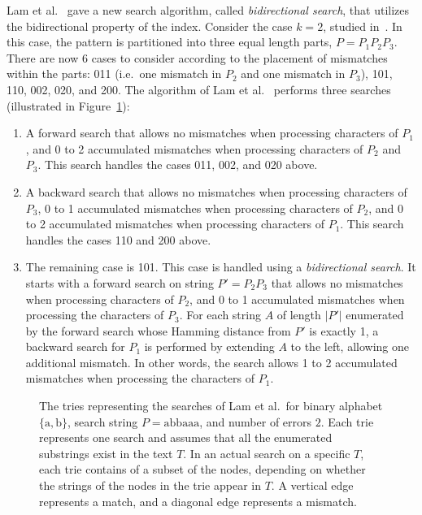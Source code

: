 \documentclass[12pt]{article}
\begin{document}
Lam et al.~\cite{LamLTWWY09} gave a new search algorithm, called
\emph{bidirectional search}, that utilizes the bidirectional property
of the index.
Consider the case $k=2$, studied in~\cite{LamLTWWY09}.
In this case, the pattern is partitioned into three equal length parts,
$P=P_1 P_2 P_3$.
There are now 6 cases to consider according to the placement of mismatches
within the parts:
011 (i.e.\ one mismatch in $P_2$ and one mismatch in $P_3$),
101, 110, 002, 020, and 200.
The algorithm of Lam et al.~\cite{LamLTWWY09} performs three searches
(illustrated in Figure~\ref{fig:tries}):
\begin{enumerate}
\item A forward search that allows no mismatches when processing
characters of $P_1$, and 0 to 2 accumulated mismatches when processing 
characters of $P_2$ and $P_3$.
This search handles the cases 011, 002, and 020 above.
\item
A backward search that allows no mismatches when processing characters
of $P_3$,
0 to 1 accumulated mismatches when processing characters of $P_2$, and
0 to 2 accumulated mismatches when processing characters of $P_1$.
This search handles the cases 110 and 200 above.
\item
The remaining case is 101.
This case is handled using a \emph{bidirectional search}.
It starts with a forward search on string $P'=P_2 P_3$ that
allows no mismatches when processing characters of $P_2$, and
0 to 1 accumulated mismatches when processing the characters of $P_3$.
For each string $A$ of length $|P'|$ enumerated by the forward search whose
Hamming distance from $P'$ is exactly 1, a backward search for $P_1$ is performed
by extending $A$ to the left, 
allowing one additional mismatch.
In other words, the search allows 1 to 2 accumulated mismatches when processing the
characters of $P_1$.
\end{enumerate}
\begin{figure}
\centering
{}
\caption{The tries representing the searches of Lam et al.\ for binary
alphabet $\{\mathrm{a},\mathrm{b}\}$, search string $P=\mathrm{abbaaa}$,
and number of errors $2$.
Each trie represents one search and assumes that all the enumerated substrings exist in the text $T$.
In an actual search on a specific $T$, each trie contains of a subset of
the nodes, depending on whether the strings of the nodes in the trie appear
in $T$.
A vertical edge represents a match, and a diagonal edge represents a mismatch.
\label{fig:tries}}
\end{figure}
\end{document}
